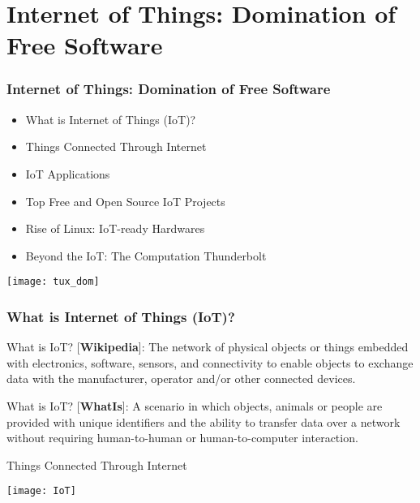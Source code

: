 \section{Internet of Things: Domination of Free Software}

\begin{frame}
  \frametitle{Internet of Things: Domination of Free Software}
  
  \begin{itemize}
      \item What is Internet of Things (IoT)?
      \item Things Connected Through Internet
      \item IoT Applications
      \item Top Free and Open Source IoT Projects
      \item Rise of Linux: IoT-ready Hardwares
      \item Beyond the IoT: The Computation Thunderbolt
  \end{itemize}
  
        \centering
  \texttt{[image: tux\_dom]}

\end{frame}




\begin{frame}
  \frametitle{What is Internet of Things (IoT)?}
  
  \begin{block}{What is IoT?}
  [\textbf{Wikipedia}]: The network of physical objects or things embedded with
electronics, software, sensors, and connectivity to enable objects to exchange
data with the manufacturer, operator and/or other connected devices.
  \end{block}

  \begin{block}{What is IoT?}
  [\textbf{WhatIs}]: A scenario in which objects, animals or people are provided with
unique identifiers and the ability to transfer data over a network without
requiring human-to-human or human-to-computer interaction.
  \end{block}

\end{frame}


\begin{frame}{Things Connected Through Internet}

\texttt{[image: IoT]}
    
\end{frame}




